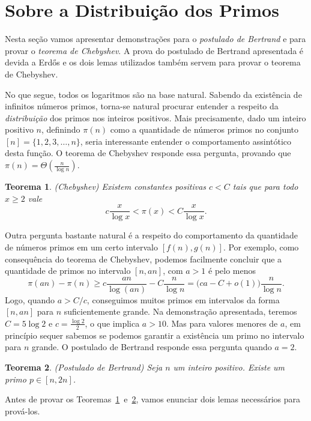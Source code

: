 \documentclass{hipatia}
\newtheorem{theorem*}{Teorema}
\begin{document}
\section{Sobre a Distribuição dos Primos}

Nesta seção vamos apresentar demonstrações para o \textit{postulado de Bertrand} e para provar o \textit{teorema de Chebyshev}. A prova do postulado de Bertrand apresentada é devida a Erd\H{o}s e os dois lemas utilizados também servem para provar o teorema de Chebyshev.

No que segue, todos os logaritmos são na base natural. Sabendo da existência de infinitos números primos, torna-se natural procurar entender a respeito da \textit{distribuição} dos primos nos inteiros positivos. Mais precisamente, dado um inteiro positivo $n$, definindo $\pi(n)$ como a quantidade de números primos no conjunto $[n]=\{1,2,3,\ldots,n\}$, seria interessante entender o comportamento assintótico desta função. O teorema de Chebyshev responde essa pergunta, provando que $\pi(n)=\Theta(\frac{n}{\log n})$.

\begin{theorem*}\label{thm:Chebyshev}
(Chebyshev) Existem constantes positivas $c<C$ tais que para todo $x \ge 2$ vale
\[c\frac{x}{\log x} < \pi(x) < C \frac{x}{\log x}.\]
\end{theorem*}

Outra pergunta bastante natural é a respeito do comportamento da quantidade de números primos em um certo intervalo $[f(n),g(n)]$. Por exemplo, como consequência do teorema de Chebyshev, podemos facilmente concluir que a quantidade de primos no intervalo $[n,an]$, com $a>1$ é pelo menos
\[\pi(an) - \pi(n) \ge c\frac{an}{\log (an)} - C\frac{n}{\log n} = \big(ca-C+o(1)\big)\frac{n}{\log n}.\]
Logo, quando $a>C/c$, conseguimos muitos primos em intervalos da forma $[n,an]$ para $n$ suficientemente grande. Na demonstração apresentada, teremos $C=5\log 2$ e $c=\frac{\log2}{2}$, o que implica $a>10$. Mas para valores menores de $a$, em princípio sequer sabemos se podemos garantir a existência um primo no intervalo para $n$ grande. O postulado de Bertrand responde essa pergunta quando $a=2$.

\begin{theorem*}\label{thm:Bertrand}
(Postulado de Bertrand) Seja $n$ um inteiro positivo. Existe um primo $p \in [n,2n]$.
\end{theorem*}

Antes de provar os Teoremas~\ref{thm:Chebyshev}~e~\ref{thm:Bertrand}, vamos enunciar dois lemas necessários para prová-los.
\end{document}
